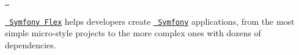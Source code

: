 

\href{https://symfony.com}{\texttt{  }}

\href{https://symfony.com/doc/current/setup/flex.html}{\texttt{ Symfony Flex}} helps developers create \href{https://symfony.com}{\texttt{ Symfony}} applications, from the most simple micro-\/style projects to the more complex ones with dozens of dependencies. 